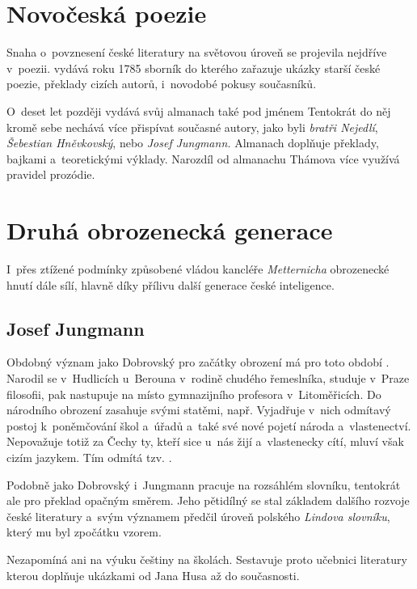 \section{Novočeská poezie
}
Snaha o~povznesení české literatury na světovou úroveň se projevila
nejdříve v~poezii.  vydává roku 1785 sborník
 do kterého zařazuje ukázky starší české
poezie, překlady cizích autorů, i~novodobé pokusy současníků.

O~deset let později vydává svůj almanach také  pod jménem  Tentokrát do něj
kromě sebe nechává více přispívat současné autory, jako byli
\emph{bratři Nejedlí}, \emph{Šebestian Hněvkovský}, nebo \emph{Josef Jungmann.}
Almanach doplňuje překlady, bajkami a~teoretickými výklady. Narozdíl od
almanachu Thámova více využívá pravidel prozódie.

\section{Druhá obrozenecká generace
}
I~přes ztížené podmínky způsobené vládou kancléře \emph{Metternicha}
obrozenecké hnutí dále sílí, hlavně díky přílivu další generace české
inteligence.

\subsection*{Josef Jungmann}
Obdobný význam jako Dobrovský pro začátky obrození má pro toto období
. Narodil se v~Hudlicích u~Berouna v~rodině chudého
řemeslníka, studuje v~Praze filosofii, pak nastupuje na místo
gymnazijního profesora v~Litoměřicích. Do národního obrození zasahuje
svými statěmi, např.  Vyjadřuje
v~nich odmítavý postoj k~poněmčování škol a~úřadů a~také své nové pojetí
národa a~vlastenectví. Nepovažuje totiž za Čechy ty, kteří sice u~nás
žijí a~vlastenecky cítí, mluví však cizím jazykem. Tím odmítá tzv.
.

Podobně jako Dobrovský i~Jungmann pracuje na rozsáhlém slovníku,
tentokrát ale pro překlad opačným směrem. Jeho pětidílný  se stal základem dalšího rozvoje české literatury
a~svým významem předčil úroveň polského \emph{Lindova slovníku}, který mu
byl zpočátku vzorem.

Nezapomíná ani na výuku češtiny na školách. Sestavuje proto učebnici
literatury  kterou doplňuje ukázkami od Jana Husa až
do současnosti.


